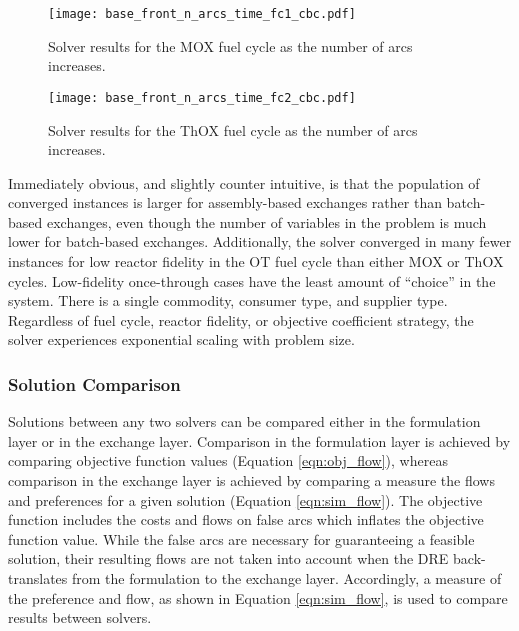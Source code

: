 \begin{figure}[h!]
  \begin{center}
    \texttt{[image: base\_front\_n\_arcs\_time\_fc1\_cbc.pdf]}
    \caption{
      \label{fig:base_front_n_arcs_time_fc1_cbc}
      \cbc Solver results for the MOX fuel cycle as the number of arcs
      increases.
      }
  \end{center}
\end{figure}

\begin{figure}[h!]
  \begin{center}
    \texttt{[image: base\_front\_n\_arcs\_time\_fc2\_cbc.pdf]}
    \caption{
      \label{fig:base_front_n_arcs_time_fc2_cbc}
      \cbc Solver results for the ThOX fuel cycle as the number of arcs
      increases.
      }
  \end{center}
\end{figure}

Immediately obvious, and slightly counter intuitive, is that the population of
converged instances is larger for assembly-based exchanges rather than
batch-based exchanges, even though the number of variables in the problem is
much lower for batch-based exchanges. Additionally, the \cbc solver converged in
many fewer instances for low reactor fidelity in the OT fuel cycle than either
MOX or ThOX cycles. Low-fidelity once-through cases have the least amount of
``choice'' in the system. There is a single commodity, consumer type, and
supplier type. Regardless of fuel cycle, reactor fidelity, or objective
coefficient strategy, the \cbc solver experiences exponential scaling with
problem size.

\subsubsection{Solution Comparison}\label{sec:res:scale:front:soln}

Solutions between any two solvers can be compared either in the formulation
layer or in the exchange layer. Comparison in the formulation layer is achieved
by comparing objective function values (Equation \ref{eqn:obj_flow}), whereas
comparison in the exchange layer is achieved by comparing a measure the flows
and preferences for a given solution (Equation \ref{eqn:sim_flow}). The
objective function includes the costs and flows on false arcs which inflates the
objective function value. While the false arcs are necessary for guaranteeing a
feasible solution, their resulting flows are not taken into account when the DRE
back-translates from the formulation to the exchange layer. Accordingly, a
measure of the preference and flow, as shown in Equation \ref{eqn:sim_flow}, is
used to compare results between solvers.

